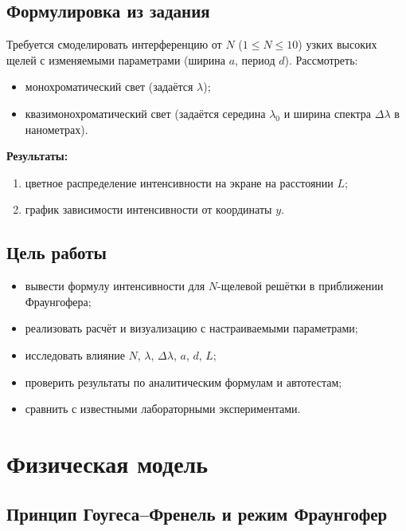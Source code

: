 \documentclass[12pt,a4paper]{article}
\begin{document}
\subsection{Формулировка из задания}

Требуется смоделировать интерференцию от \(N\) (\(1\le N\le10\)) узких высоких
щелей с изменяемыми параметрами (ширина \(a\), период \(d\)). Рассмотреть:
\begin{itemize}
  \item монохроматический свет (задаётся \(\lambda\));
  \item квазимонохроматический свет (задаётся середина \(\lambda_0\) и ширина
        спектра \(\Delta\lambda\) в нанометрах).
\end{itemize}

\textbf{Результаты:}
\begin{enumerate}
  \item цветное распределение интенсивности на экране на расстоянии \(L\);
  \item график зависимости интенсивности от координаты \(y\).
\end{enumerate}

\subsection{Цель работы}

\begin{itemize}
  \item вывести формулу интенсивности для \(N\)-щелевой решётки в приближении
        Фраунгофера;
  \item реализовать расчёт и визуализацию с настраиваемыми параметрами;
  \item исследовать влияние \(N\), \(\lambda\), \(\Delta\lambda\), \(a\), \(d\), \(L\);
  \item проверить результаты по аналитическим формулам и автотестам;
  \item сравнить с известными лабораторными экспериментами.
\end{itemize}

\section{Физическая модель}

\subsection{Принцип Гоугеса–Френель и режим Фраунгофер}
\end{document}
